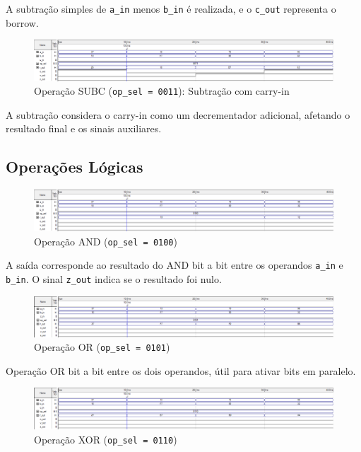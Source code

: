 A subtração simples de \texttt{a\_in} menos \texttt{b\_in} é realizada, e o \texttt{c\_out} representa o borrow.

\begin{figure}[H]
\centering
\includegraphics[width=\textwidth]{images/alu_0011.png}
\caption{Operação SUBC (\texttt{op\_sel = 0011}): Subtração com carry-in}
\end{figure}

A subtração considera o carry-in como um decrementador adicional, afetando o resultado final e os sinais auxiliares.

\subsection{Operações Lógicas}

\begin{figure}[H]
\centering
\includegraphics[width=\textwidth]{images/alu_0100.png}
\caption{Operação AND (\texttt{op\_sel = 0100})}
\end{figure}

A saída corresponde ao resultado do AND bit a bit entre os operandos \texttt{a\_in} e \texttt{b\_in}. O sinal \texttt{z\_out} indica se o resultado foi nulo.

\begin{figure}[H]
\centering
\includegraphics[width=\textwidth]{images/alu_0101.png}
\caption{Operação OR (\texttt{op\_sel = 0101})}
\end{figure}

Operação OR bit a bit entre os dois operandos, útil para ativar bits em paralelo.

\begin{figure}[H]
\centering
\includegraphics[width=\textwidth]{images/alu_0110.png}
\caption{Operação XOR (\texttt{op\_sel = 0110})}
\end{figure}

